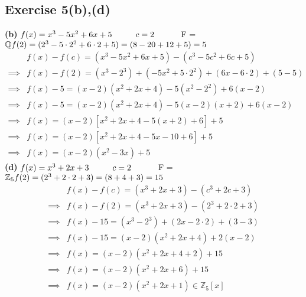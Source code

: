 \subsection*{Exercise 5(b),(d)}
\textbf{(b)}
$f(x) = x^3 - 5x^2 + 6x + 5 \hspace{10mm} c = 2 \hspace{10mm}$ F = $\mathbb{Q} \\
f(2) = (2^3 - 5\cdot2^2 + 6\cdot2 + 5) = (8 - 20 + 12 + 5) = 5$
\begin{align*}
    & f(x) - f(c) = (x^3 - 5x^2 + 6x + 5) - (c^3 - 5c^2 + 6c + 5) \\
    \implies & f(x) - f(2) = (x^3 - 2^3) + (-5x^2 + 5\cdot2^2) + (6x - 6\cdot2) + (5 - 5) \\
    \implies & f(x) - 5 = (x - 2)(x^2 + 2x + 4) - 5(x^2 - 2^2) + 6(x - 2) \\
    \implies & f(x) - 5 = (x - 2)(x^2 + 2x + 4) - 5(x - 2)(x + 2) + 6(x - 2) \\
    \implies & f(x) = (x - 2)[ x^2 + 2x + 4 - 5(x + 2) + 6 ] + 5 \\
    \implies & f(x) = (x - 2)[ x^2 + 2x + 4 - 5x - 10 + 6 ] + 5 \\
    \implies & f(x) = (x - 2)(x^2 - 3x) + 5
\end{align*}
\textbf{(d)}
$f(x) = x^3 + 2x + 3 \hspace{10mm} c = 2 \hspace{10mm}$ F = $\mathbb{Z}_5 \\
f(2) = (2^3 + 2\cdot2 + 3) = (8 + 4 + 3) = 15$
\begin{align*}
    & f(x) - f(c) = (x^3 + 2x + 3) - (c^3 + 2c + 3) \\
    \implies & f(x) - f(2) = (x^3 + 2x + 3) - (2^3 + 2\cdot2 + 3) \\
    \implies & f(x) - 15 = (x^3 - 2^3) + (2x - 2\cdot2) + (3 - 3) \\
    \implies & f(x) - 15 = (x - 2)(x^2 + 2x + 4) + 2(x - 2) \\
    \implies & f(x) = (x - 2)(x^2 + 2x + 4 + 2) + 15 \\
    \implies & f(x) = (x - 2)(x^2 + 2x + 6) + 15 \\
    \implies & f(x) = (x - 2)(x^2 + 2x + 1) \in \mathbb{Z}_5[x]
\end{align*}